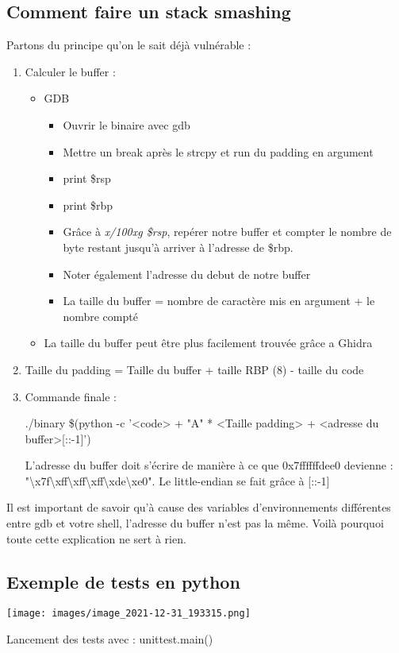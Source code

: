 \documentclass[a4paper]{article}
\begin{document}
\subsection{Comment faire un stack smashing}
Partons du principe qu'on le sait déjà vulnérable :
\begin{enumerate}
    \item Calculer le buffer :
    \begin{itemize}
        \item GDB
        \begin{itemize}
            \item Ouvrir le binaire avec gdb
            \item Mettre un break après le strcpy et run du padding en argument
            \item print \$rsp
            \item print \$rbp
            \item Grâce à \emph{x/100xg \$rsp}, repérer notre buffer et compter le nombre de byte restant jusqu'à arriver à l'adresse de \$rbp.
            \item Noter également l'adresse du debut de notre buffer
            \item La taille du buffer = nombre de caractère mis en argument + le nombre compté
        \end{itemize}
        \item La taille du buffer peut être plus facilement trouvée grâce a Ghidra
    \end{itemize}
    \item Taille du padding = Taille du buffer + taille RBP (8) - taille du code
    \item Commande finale :\\
    \begin{example}
    ./binary \$(python -c '<code> + "A" * <Taille padding> + <adresse du buffer>[::-1]')
    \end{example}
    L'adresse du buffer doit s'écrire de manière à ce que 0x7ffffffdee0 devienne : "\textbackslash x7f\textbackslash xff\textbackslash xff\textbackslash xff\textbackslash xde\textbackslash xe0". Le little-endian se fait grâce à [::-1]
\end{enumerate}
Il est important de savoir qu'à cause des variables d'environnements différentes entre gdb et votre shell, l'adresse du buffer n'est pas la même. Voilà pourquoi toute cette explication ne sert à rien.

\subsection{Exemple de tests en python}
\begin{center}
    \texttt{[image: images/image\_2021-12-31\_193315.png]}
\end{center}
Lancement des tests avec : unittest.main()
\end{document}
